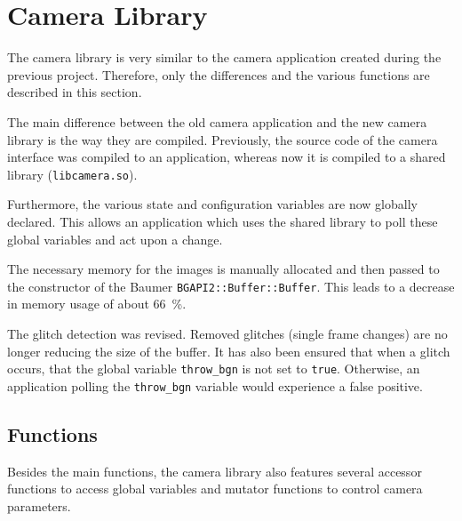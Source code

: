 \section{Camera Library}
\label{sec:inference:camera_library}

The camera library is very similar to the camera application created during the previous project.
Therefore, only the differences and the various functions are described in this section.

The main difference between the old camera application and the new camera library is the way they are compiled.
Previously, the source code of the camera interface was compiled to an application, whereas now it is compiled to a shared library (\texttt{libcamera.so}).

Furthermore, the various state and configuration variables are now globally declared.
This allows an application which uses the shared library to poll these global variables and act upon a change.

The necessary memory for the images is manually allocated and then passed to the constructor of the Baumer \texttt{BGAPI2::Buffer::Buffer}.
This leads to a decrease in memory usage of about \SI{66}{\percent}. 

The glitch detection was revised.
Removed glitches (single frame changes) are no longer reducing the size of the buffer.
It has also been ensured that when a glitch occurs, that the global variable \texttt{throw\_bgn} is not set to \texttt{true}.
Otherwise, an application polling the \texttt{throw\_bgn} variable would experience a false positive.

\subsection{Functions}
\label{subsec:inference:camera_library:functions}

Besides the main functions, the camera library also features several accessor functions to access global variables and mutator functions to control camera parameters.

